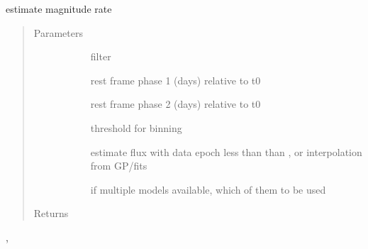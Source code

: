 \documentclass[letterpaper,10pt,english]{sphinxmanual}
\begin{document}
\begin{fulllineitems}
\label{\detokenize{generated/sdapy.snerun.snobject._rate_at:sdapy.snerun.snobject._rate_at}}
estimate magnitude rate
\begin{quote}\begin{description}
\item[{Parameters}] \leavevmode\begin{description}
\item[{}] \leavevmode{[}\sphinxtitleref{str}{]}
filter

\item[{}] \leavevmode{[}\sphinxtitleref{float}{]}
rest frame phase 1 (days) relative to t0

\item[{}] \leavevmode{[}\sphinxtitleref{float}{]}
rest frame phase 2 (days) relative to t0

\item[{}] \leavevmode{[}\sphinxtitleref{float}{]}
threshold for binning

\item[{}] \leavevmode{[}\sphinxtitleref{str}{]}
estimate flux with data epoch less than than , or interpolation from GP/fits

\item[{}] \leavevmode{[}\sphinxtitleref{int}{]}
if multiple models available, which of them to be used

\end{description}

\item[{Returns}] \leavevmode\begin{description}
\item[{}] \leavevmode{[}\sphinxtitleref{float}{]}
\item[{}] \leavevmode{[}\sphinxtitleref{float}{]}
\end{description}

\end{description}\end{quote}



\begin{description}
\item[{, }] \leavevmode
\end{description}



\end{fulllineitems}
\end{document}
